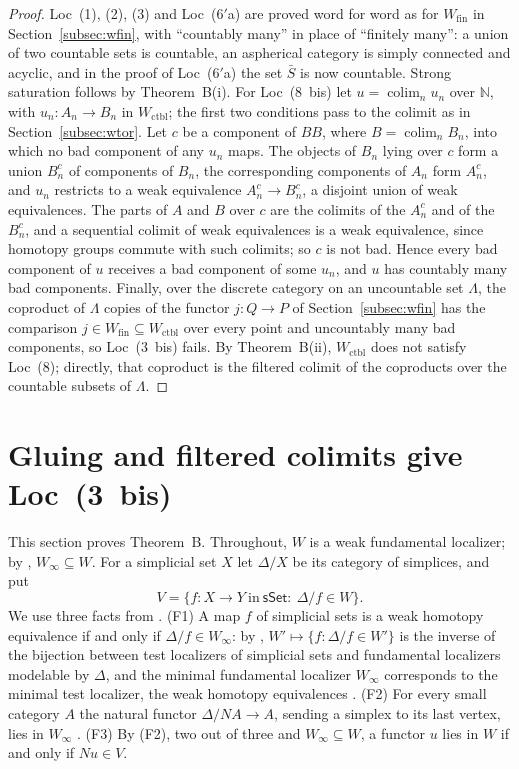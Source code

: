 \documentclass[11pt,a4paper]{article}
\theoremstyle{definition}
\newcommand{\sSet}{\mathsf{sSet}}
\newcommand{\Winf}{W_{\infty}}
\newcommand{\Wfin}{W_{\mathrm{fin}}}
\newcommand{\Wctbl}{W_{\mathrm{ctbl}}}
\newcommand{\N}{\mathbb{N}}
\newcommand{\colim}{\operatorname*{colim}}
\begin{document}
\begin{proof}
Loc~(1), (2), (3) and Loc~($6'$a) are proved word for word as for $\Wfin$ in
Section~\ref{subsec:wfin}, with ``countably many'' in place of ``finitely many'': a union of two
countable sets is countable, an aspherical category is simply connected and acyclic, and in
the proof of Loc~($6'$a) the set $\bar S$ is now countable. Strong saturation follows by
Theorem~B(i). For Loc~(8~bis) let $u=\colim_nu_n$ over $\N$, with $u_n\colon A_n\to B_n$ in
$\Wctbl$; the first two conditions pass to the colimit as in Section~\ref{subsec:wtor}. Let $c$
be a component of $BB$, where $B=\colim_nB_n$, into which no bad component of any $u_n$ maps.
The objects of $B_n$ lying over $c$ form a union $B_n^c$ of components of $B_n$, the
corresponding components of $A_n$ form $A_n^c$, and $u_n$ restricts to a weak equivalence
$A_n^c\to B_n^c$, a disjoint union of weak equivalences. The parts of $A$ and $B$ over $c$ are
the colimits of the $A_n^c$ and of the $B_n^c$, and a sequential colimit of weak equivalences
is a weak equivalence, since homotopy groups commute with such colimits; so $c$ is not bad.
Hence every bad component of $u$ receives a bad component of some $u_n$, and $u$ has countably
many bad components. Finally, over the discrete category on an uncountable set $\Lambda$, the
coproduct of $\Lambda$ copies of the functor $j\colon Q\to P$ of Section~\ref{subsec:wfin} has
the comparison $j\in\Wfin\subseteq\Wctbl$ over every point and uncountably many bad
components, so Loc~(3~bis) fails. By Theorem~B(ii), $\Wctbl$ does not satisfy Loc~(8);
directly, that coproduct is the filtered colimit of the coproducts over the countable subsets
of $\Lambda$.
\end{proof}

\section{Gluing and filtered colimits give Loc~(3~bis)}\label{sec:positive}

This section proves Theorem~B. Throughout, $W$ is a weak fundamental localizer; by
\cite[Th.~6.1.18]{Cis06}, $\Winf\subseteq W$. For a simplicial set $X$ let $\Delta/X$ be its
category of simplices, and put
\[
V=\{f\colon X\to Y\ \text{in}\ \sSet:\ \Delta/f\in W\}.
\]
We use three facts from \cite{Cis06}. (F1) A map $f$ of simplicial sets is a weak homotopy
equivalence if and only if $\Delta/f\in\Winf$: by \cite[Th.~4.2.15]{Cis06}, $W'\mapsto
\{f:\Delta/f\in W'\}$ is the inverse of the bijection between test localizers of simplicial sets
and fundamental localizers modelable by $\Delta$, and the minimal fundamental localizer $\Winf$
corresponds to the minimal test localizer, the weak homotopy equivalences
\cite[Cor.~2.1.21 and proof of Cor.~4.2.19]{Cis06}. (F2) For every small category $A$ the
natural functor $\Delta/NA\to A$, sending a simplex to its last vertex, lies in $\Winf$
\cite[Th.~4.1.26 and Ex.~4.1.29]{Cis06}. (F3) By (F2), two out of three and
$\Winf\subseteq W$, a functor $u$ lies in $W$ if and only if $Nu\in V$.
\end{document}
